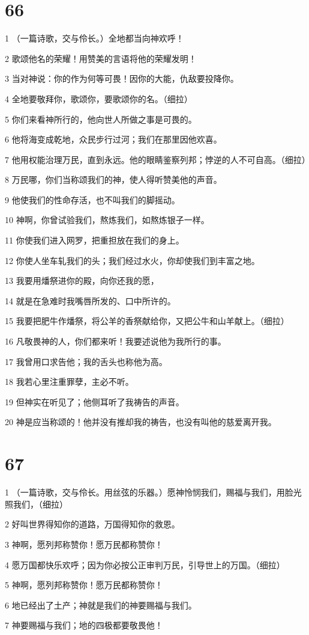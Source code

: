 \chapter{66}

\par 1 （一篇诗歌，交与伶长。）全地都当向神欢呼！
\par 2 歌颂他名的荣耀！用赞美的言语将他的荣耀发明！
\par 3 当对神说：你的作为何等可畏！因你的大能，仇敌要投降你。
\par 4 全地要敬拜你，歌颂你，要歌颂你的名。（细拉）
\par 5 你们来看神所行的，他向世人所做之事是可畏的。
\par 6 他将海变成乾地，众民步行过河；我们在那里因他欢喜。
\par 7 他用权能治理万民，直到永远。他的眼睛鉴察列邦；悖逆的人不可自高。（细拉）
\par 8 万民哪，你们当称颂我们的神，使人得听赞美他的声音。
\par 9 他使我们的性命存活，也不叫我们的脚摇动。
\par 10 神啊，你曾试验我们，熬炼我们，如熬炼银子一样。
\par 11 你使我们进入网罗，把重担放在我们的身上。
\par 12 你使人坐车轧我们的头；我们经过水火，你却使我们到丰富之地。
\par 13 我要用燔祭进你的殿，向你还我的愿，
\par 14 就是在急难时我嘴唇所发的、口中所许的。
\par 15 我要把肥牛作燔祭，将公羊的香祭献给你，又把公牛和山羊献上。（细拉）
\par 16 凡敬畏神的人，你们都来听！我要述说他为我所行的事。
\par 17 我曾用口求告他；我的舌头也称他为高。
\par 18 我若心里注重罪孽，主必不听。
\par 19 但神实在听见了；他侧耳听了我祷告的声音。
\par 20 神是应当称颂的！他并没有推却我的祷告，也没有叫他的慈爱离开我。

\chapter{67}

\par 1 （一篇诗歌，交与伶长。用丝弦的乐器。）愿神怜悯我们，赐福与我们，用脸光照我们，（细拉）
\par 2 好叫世界得知你的道路，万国得知你的救恩。
\par 3 神啊，愿列邦称赞你！愿万民都称赞你！
\par 4 愿万国都快乐欢呼；因为你必按公正审判万民，引导世上的万国。（细拉）
\par 5 神啊，愿列邦称赞你！愿万民都称赞你！
\par 6 地已经出了土产；神就是我们的神要赐福与我们。
\par 7 神要赐福与我们；地的四极都要敬畏他！

